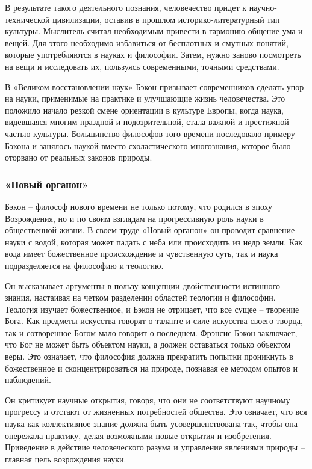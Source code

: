 \documentclass[
]{article}
\begin{document}
В результате такого деятельного познания, человечество придет к
научно-технической цивилизации, оставив в прошлом историко-литературный
тип культуры. Мыслитель считал необходимым привести в гармонию общение
ума и вещей. Для этого необходимо избавиться от бесплотных и смутных
понятий, которые употребляются в науках и философии. Затем, нужно заново
посмотреть на вещи и исследовать их, пользуясь современными, точными
средствами.

В «Великом восстановлении наук» Бэкон призывает современников сделать
упор на науки, применимые на практике и улучшающие жизнь человечества.
Это положило начало резкой смене ориентации в культуре Европы, когда
наука, видевшаяся многим праздной и подозрительной, стала важной и
престижной частью культуры. Большинство философов того времени
последовало примеру Бэкона и занялось наукой вместо схоластического
многознания, которое было оторвано от реальных законов природы.

\hypertarget{ux43dux43eux432ux44bux439-ux43eux440ux433ux430ux43dux43eux43d}{%
\subsubsection{«Новый
органон»}\label{ux43dux43eux432ux44bux439-ux43eux440ux433ux430ux43dux43eux43d}}

Бэкон -- философ нового времени не только потому, что родился в эпоху
Возрождения, но и по своим взглядам на прогрессивную роль науки в
общественной жизни. В своем труде «Новый органон» он проводит сравнение
науки с водой, которая может падать с неба или происходить из недр
земли. Как вода имеет божественное происхождение и чувственную суть, так
и наука подразделяется на философию и теологию.

Он высказывает аргументы в пользу концепции двойственности истинного
знания, настаивая на четком разделении областей теологии и философии.
Теология изучает божественное, и Бэкон не отрицает, что все сущее --
творение Бога. Как предметы искусства говорят о таланте и силе искусства
своего творца, так и сотворенное Богом мало говорит о последнем. Фрэнсис
Бэкон заключает, что Бог не может быть объектом науки, а должен
оставаться только объектом веры. Это означает, что философия должна
прекратить попытки проникнуть в божественное и сконцентрироваться на
природе, познавая ее методом опытов и наблюдений.

Он критикует научные открытия, говоря, что они не соответствуют научному
прогрессу и отстают от жизненных потребностей общества. Это означает,
что вся наука как коллективное знание должна быть усовершенствована так,
чтобы она опережала практику, делая возможными новые открытия и
изобретения. Приведение в действие человеческого разума и управление
явлениями природы -- главная цель возрождения науки.
\end{document}
